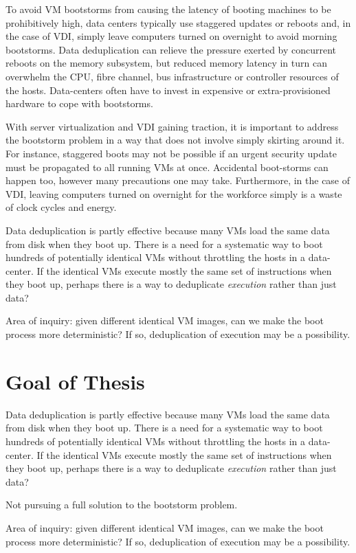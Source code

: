 To avoid VM bootstorms from causing the latency of booting machines
to be prohibitively high, data centers typically 
use staggered updates or reboots and, in the case of VDI,
simply leave computers turned on overnight to avoid morning
bootstorms. Data deduplication can relieve the pressure exerted by
concurrent reboots on the memory subsystem,
but reduced memory latency in turn can overwhelm the CPU,
fibre channel, bus infrastructure or controller resources of
the hosts. Data-centers often have to invest in expensive 
or extra-provisioned hardware to cope with bootstorms. 

With server virtualization and VDI gaining traction, it is
important to address the bootstorm problem in a way that does not 
involve simply skirting around it. For instance, staggered boots may not be 
possible if an urgent security update must be propagated to
all running VMs at once. Accidental boot-storms can happen too, 
however many precautions one may take. Furthermore,
in the case of VDI, leaving computers turned on overnight for the workforce
simply is a waste of clock cycles and energy. 

Data deduplication is partly effective because many VMs load
the same data from disk when they boot up.  There is a need 
for a systematic way to boot hundreds of potentially
identical VMs without throttling the hosts in a data-center.
If the identical VMs execute mostly the same set of instructions when they boot up,
perhaps there is a way to deduplicate \emph{execution} rather than just data?

Area of inquiry: given different identical VM images, can we 
make the boot process more deterministic? If so, 
deduplication of execution may be a possibility.
\section{Goal of Thesis}

Data deduplication is partly effective because many VMs load
the same data from disk when they boot up.  There is a need 
for a systematic way to boot hundreds of potentially
identical VMs without throttling the hosts in a data-center.
If the identical VMs execute mostly the same set of instructions when they boot up,
perhaps there is a way to deduplicate \emph{execution} rather than just data?

Not pursuing a full solution to the bootstorm problem.

Area of inquiry: given different identical VM images, can we 
make the boot process more deterministic? If so, 
deduplication of execution may be a possibility.

